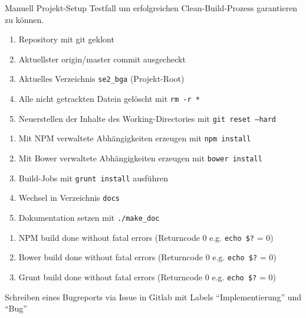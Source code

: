 \begin{testcase}[tc:build]{Manuell}
\tcSubject Projekt-Setup
\tcRemark Testfall um erfolgreichen Clean-Build-Prozess garantieren zu können.
\tcConditions
	\begin{enumerate}
	\item Repository mit git geklont
	\item Aktuellster origin/master commit ausgecheckt
	\item Aktuelles Verzeichnis \texttt{se2\_bga} (Projekt-Root)
	\item Alle nicht getrackten Datein gelöscht mit \texttt{rm -r *}
	\item Neuerstellen der Inhalte des Working-Directories mit \texttt{git reset --hard}
	\end{enumerate}
\tcProceeding
	\begin{enumerate}
	\item Mit NPM verwaltete Abhängigkeiten erzeugen mit \texttt{npm install}
	\item Mit Bower verwaltete Abhängigkeiten erzeugen mit \texttt{bower install}
	\item Build-Jobs mit \texttt{grunt install} ausführen
	\item Wechsel in Verzeichnis \texttt{docs}
	\item Dokumentation setzen mit \texttt{./make\_doc}
	\end{enumerate}
\tcGoal
	\begin{enumerate}
	\item NPM build done without fatal errors (Returncode 0 e.g. \texttt{echo \$?} = 0)
	\item Bower build done without fatal errors (Returncode 0 e.g. \texttt{echo \$?} = 0)
	\item Grunt build done without fatal errors (Returncode 0 e.g. \texttt{echo \$?} = 0)
	\end{enumerate}
\tcError Schreiben eines Bugreports via Issue in Gitlab mit Labels "`Implementierung"' und "`Bug"'
\end{testcase}


